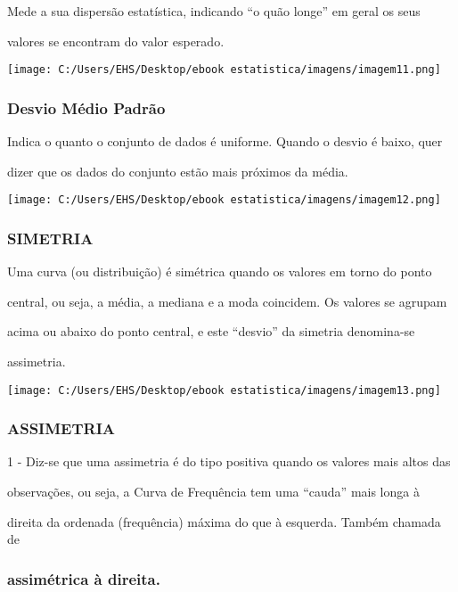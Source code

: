 \documentclass[]{book}
\begin{document}
Mede a sua dispersão estatística, indicando ``o quão longe'' em geral os seus

valores se encontram do valor esperado.

\texttt{[image: C:/Users/EHS/Desktop/ebook estatistica/imagens/imagem11.png]}

\hypertarget{desvio-medio-padrao}{%
\subsubsection{Desvio Médio Padrão}\label{desvio-medio-padrao}}

Indica o quanto o conjunto de dados é uniforme. Quando o desvio é baixo, quer

dizer que os dados do conjunto estão mais próximos da média.

\texttt{[image: C:/Users/EHS/Desktop/ebook estatistica/imagens/imagem12.png]}

\hypertarget{simetria}{%
\subsubsection{SIMETRIA}\label{simetria}}

Uma curva (ou distribuição) é simétrica quando os valores em torno do ponto

central, ou seja, a média, a mediana e a moda coincidem. Os valores se agrupam

acima ou abaixo do ponto central, e este ``desvio'' da simetria denomina-se

assimetria.

\texttt{[image: C:/Users/EHS/Desktop/ebook estatistica/imagens/imagem13.png]}

\hypertarget{assimetria}{%
\subsubsection{ASSIMETRIA}\label{assimetria}}

1 - Diz-se que uma assimetria é do tipo positiva quando os valores mais altos das

observações, ou seja, a Curva de Frequência tem uma ``cauda'' mais longa à

direita da ordenada (frequência) máxima do que à esquerda. Também chamada de

\hypertarget{assimetrica-a-direita.}{%
\subsubsection{assimétrica à direita.}\label{assimetrica-a-direita.}}
\end{document}
